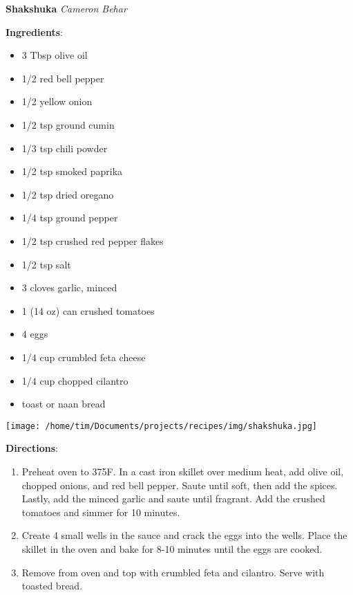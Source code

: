 \documentclass[11pt, twoside, openany]{book}
\begin{document}
\noindent\begin{minipage}[t]{\linewidth}%
{\Large\textbf{Shakshuka}} \label{shakshuka}\hfill\textit{Cameron Behar}\\
\noindent\begin{minipage}[t]{0.78\linewidth}%
\textbf{Ingredients}:\vspace{-3mm}
\begin{multicols}{2}
\begin{itemize}\setlength\itemsep{-1mm}
\item 3 Tbsp olive oil
\item 1/2 red bell pepper
\item 1/2 yellow onion
\item 1/2 tsp ground cumin
\item 1/3 tsp chili powder
\item 1/2 tsp smoked paprika
\item 1/2 tsp dried oregano
\item 1/4 tsp ground pepper
\item 1/2 tsp crushed red pepper flakes
\item 1/2 tsp salt
\item 3 cloves garlic, minced
\item 1 (14 oz) can crushed tomatoes
\item 4 eggs
\item 1/4 cup crumbled feta cheese
\item 1/4 cup chopped cilantro
\item toast or naan bread
\end{itemize}
\end{multicols}
\end{minipage}
\noindent\begin{minipage}[t]{0.18\linewidth}
\centering \strut\vspace*{-\baselineskip}\newline
\texttt{[image: /home/tim/Documents/projects/recipes/img/shakshuka.jpg]}\\
\end{minipage}\vspace{3mm}
\textbf{Directions}:
\vspace{-3mm}\begin{enumerate}\setlength\itemsep{-1mm}
\item Preheat oven to 375F. In a cast iron skillet over medium heat, add olive oil, chopped onions, and red bell pepper. Saute until soft, then add the spices. Lastly, add the minced garlic and saute until fragrant. Add the crushed tomatoes and simmer for 10 minutes.
\item Create 4 small wells in the sauce and crack the eggs into the wells. Place the skillet in the oven and bake for 8-10 minutes until the eggs are cooked.
\item Remove from oven and top with crumbled feta and cilantro. Serve with toasted bread.
\end{enumerate}
\end{minipage}\vspace{8mm}
\end{document}
